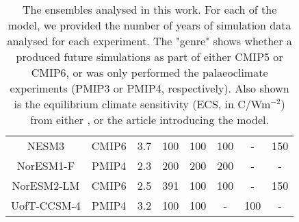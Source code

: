 \begin{table}
\begin{tabular}{ c |  c | c | c | c | c| c | c  }
NESM3&CMIP6&3.7&100&100&100& -&150\\
NorESM1-F&PMIP4&2.3&200&200&200& -& -\\
NorESM2-LM&CMIP6&2.5&391&100&100& -&150\\
UofT-CCSM-4&PMIP4&3.2&100&100& -&100& -\\
\hline
\end{tabular}
\caption{The ensembles analysed in this work. For each of the model, we provided the number of years of simulation data analysed for each experiment. The "genre" shows whether a produced future simulations as part of either CMIP5 or CMIP6, or was only performed the palaeoclimate experiments (PMIP3 or PMIP4, respectively). Also shown is the equilibrium climate sensitivity (ECS, in \textdegree C/Wm$^{-2}$) from either \citet{zelinka2020causes}, \citet{collins2013long} or the article introducing the model.}
\label{tab:model}
\end{table}

